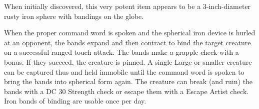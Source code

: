 {\begin{comment}
The fortress is deactivated by speaking a command word (different from the one used to activate it). It cannot be deactivated unless it is empty.

Strong conjuration; CL 13th; Craft Wondrous Item, mage's magnificent mansion; Price 55,000 gp.
\end{comment}

 When initially discovered, this very potent item appears to be a 3-inch-diameter rusty iron sphere with bandings on the globe.

When the proper command word is spoken and the spherical iron device is hurled at an opponent, the bands expand and then contract to bind the target creature on a successful ranged touch attack. The bands make a grapple check with a  bonus. If they succeed, the creature is pinned. A single Large or smaller creature can be captured thus and held immobile until the command word is spoken to bring the bands into spherical form again. The creature can break (and ruin) the bands with a DC 30 Strength check or escape them with a  Escape Artist check. Iron bands of binding are usable once per day.


\begin{comment}
Iron Flask} These special containers are typically inlaid with runes of silver and stoppered by a brass plug bearing a seal engraved with sigils, glyphs, and special symbols. When the user speaks the command word, he can force any creature from another plane into the container, provided that creature fails a DC 19 Will save. The range of this effect is 60 feet. Only one creature at a time can be so contained. Loosing the stopper frees the captured creature.

The command word can be given only once per day.

If the individual freeing the captured creature speaks the command word, the creature can be forced to serve for 1 hour. If freed without the command word, the creature acts according to its natural inclinations. (It usually attacks the user, unless it perceives a good reason not to.) Any attempt to force the same creature into the flask a second time provides it a \plus2 bonus on its saving throw and makes it hostile. A newly discovered bottle might contain any of the following:


\end{comment}}
